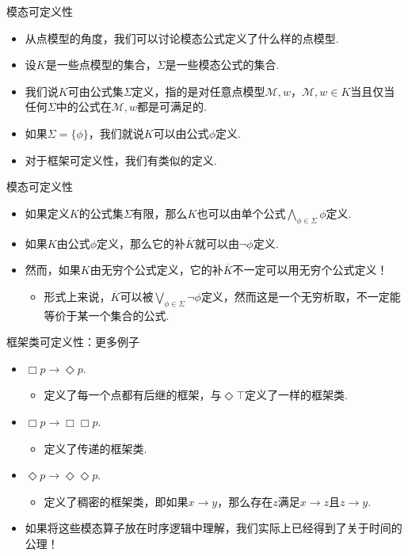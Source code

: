     \begin{frame}{模态可定义性}
    \begin{itemize}
        \item 从点模型的角度，我们可以讨论模态公式定义了什么样的点模型.
        \item 设$K$是一些点模型的集合，$\Sigma$是一些模态公式的集合.
        \item 我们说$K$可由公式集$\Sigma$定义，指的是对任意点模型$\mathcal M,w$，$\mathcal M,w\in K$当且仅当任何$\Sigma$中的公式在$\mathcal M,w$都是可满足的.
        \item 如果$\Sigma=\{\phi\}$，我们就说$K$可以由公式$\phi$定义.
        \item 对于框架可定义性，我们有类似的定义.
    \end{itemize}
    \end{frame}
    
    \begin{frame}{模态可定义性}
    \begin{itemize}
        \item 如果定义$K$的公式集$\Sigma$有限，那么$K$也可以由单个公式$\bigwedge_{\phi\in\Sigma}\phi$定义.
        \item 如果$K$由公式$\phi$定义，那么它的补$\overline{K}$就可以由$\neg\phi$定义.
        \item 然而，如果$K$由无穷个公式定义，它的补$\overline{K}$不一定可以用无穷个公式定义！
        \begin{itemize}
            \item 形式上来说，$\overline{K}$可以被$\bigvee_{\phi\in\Sigma}\neg\phi$定义，然而这是一个无穷析取，不一定能等价于某一个集合的公式.
        \end{itemize}
    \end{itemize}
    \end{frame}
    
    \begin{frame}{框架类可定义性：更多例子}
    \begin{itemize}
        \item $\Box p\to\Diamond p$.
        \begin{itemize}
            \item 定义了每一个点都有后继的框架，与$\Diamond\top$定义了一样的框架类.
        \end{itemize}
        \item $\Box p\to\Box\Box p$.
        \begin{itemize}
            \item 定义了传递的框架类.
        \end{itemize}
        \item $\Diamond p\to\Diamond \Diamond p$.
        \begin{itemize}
            \item 定义了稠密的框架类，即如果$x\to y$，那么存在$z$满足$x\to z$且$z\to y$.
        \end{itemize}
        \item 如果将这些模态算子放在时序逻辑中理解，我们实际上已经得到了关于时间的公理！%
    \end{itemize}
    \end{frame}
    
